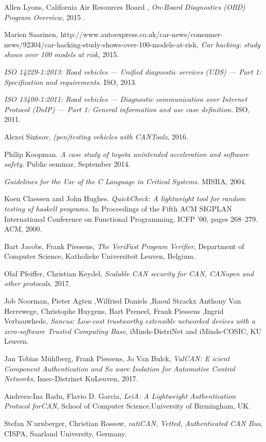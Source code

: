 \documentclass[11pt]{article}
\begin{document}
\begin{thebibliography}{10}
	Allen Lyons, California Air Resources Board ,
	\textit{On-Board Diagnostics (OBD) Program Overview},
	2015 .
	
	Marien Saarinen, http://www.autoexpress.co.uk/car-news/consumer-news/92304/car-hacking-study-shows-over-100-models-at-risk, 
	\textit{Car hacking: study shows over 100 models at risk},
	2015.
	
	\textit{ISO 14229-1:2013: Road vehicles — Unified diagnostic services (UDS) — Part 1: Specification and requirements.}
	ISO, 2013.
	
	\textit{ISO 13400-1:2011: Road vehicles — Diagnostic communication over Internet Protocol (DoIP) — Part 1: General information and use case definition.} ISO, 2011.
	
	Alexei Sintsov, 
	\textit{(pen)testing vehicles with CANToolz},
	2016.
	
	Philip Koopman. \textit{A case study of toyota unintended acceleration and software safety.} Public seminar, September 2014.
	
	\textit{Guidelines for the Use of the C Language in Critical Systems.} MISRA, 2004.
	
	Koen Claessen and John Hughes. 
	\textit{QuickCheck: A lightweight tool for random testing of haskell programs.} In Proceedings of the Fifth ACM SIGPLAN International Conference on Functional Programming, ICFP ’00, pages 268–279. ACM, 2000.
	
	Bart Jacobs, Frank Piessens,
	\textit{The VeriFast Program Verifier}, Department of Computer Science, Katholieke Universiteit Leuven, Belgium.
	
	Olaf Pfeiffer, Christian Keydel, 
	\textit{Scalable CAN security for CAN, CANopen and other protocols}, 2017.
	
	Job Noorman, Pieter Agten ,Wilfried Daniels ,Raoul Strackx
	Anthony Van Herrewege, Christophe Huygens, Bart Preneel, Frank Piessens
    ,Ingrid Verbauwhede, \textit{Sancus: Low-cost trustworthy extensible networked devices with a zero-software Trusted Computing Base}, iMinds-DistriNet and iMinds-COSIC, KU Leuven.
    
    Jan Tobias Mühlberg, Frank Piessens, Jo Van Bulck,
    \textit{VulCAN: E icient Component Authentication and So ware Isolation for Automotive Control Networks}, Imec-Distrinet KuLeuven, 2017.
    
    Andreea-Ina Radu, Flavio D. Garcia,
    \textit{LeiA: A Lightweight Authentication Protocol forCAN},
    School of Computer Science,University of Birmingham, UK.
    
    Stefan N ̈urnberger, Christian Rossow,
    \textit{vatiCAN, Vetted, Authenticated CAN Bus},
	CISPA, Saarland University, Germany.

	
\end{thebibliography}
\end{document}
